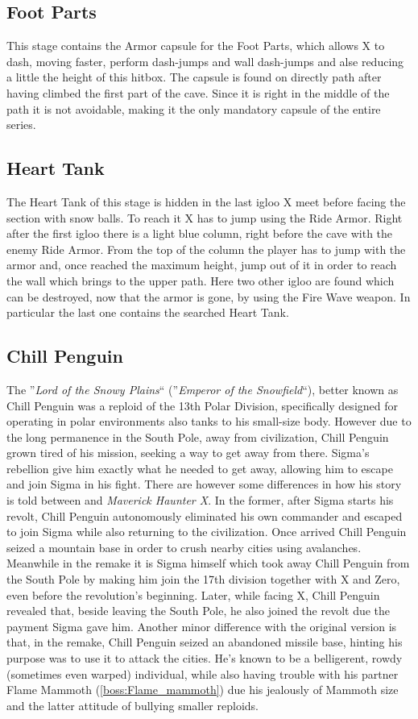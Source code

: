 \subsection{Foot Parts}
This stage contains the Armor capsule for the Foot Parts, which allows X to dash, moving faster, perform dash-jumps and wall dash-jumps and alse reducing a little the height of this hitbox. The capsule is found on directly path after having climbed the first part of the cave. Since it is right in the middle of the path it is not avoidable, making it the only mandatory capsule of the entire series.
\subsection{Heart Tank}
The Heart Tank of this stage is hidden in the last igloo X meet before facing the section with snow balls. To reach it X has to jump using the Ride Armor. Right after the first igloo there is a light blue column, right before the cave with the enemy Ride Armor. From the top of the column the player has to jump with the armor and, once reached the maximum height, jump out of it in order to reach the wall which brings to the upper path. Here two other igloo are found which can be destroyed, now that the armor is gone, by using the Fire Wave weapon. In particular the last one contains the searched Heart Tank.
\subsection{Chill Penguin}\label{boss:Chill_Penguin}
The ''\textit{Lord of the Snowy Plains}``\cite{MHX:manual} (''\textit{Emperor of the Snowfield}``\cite{wayback:X_resources}), better known as Chill Penguin was a reploid of the 13th Polar Division, specifically designed for operating in polar environments also tanks to his small-size body. However due to the long permanence in the South Pole, away from civilization, Chill Penguin grown tired of his mission, seeking a way to get away from there. Sigma's rebellion give him exactly what he needed to get away, allowing him to escape and join Sigma in his fight. There are however some differences in how his story is told between \x and \textit{Maverick Haunter X}. In the former, after Sigma starts his revolt, Chill Penguin autonomously eliminated his own commander and escaped to join Sigma while also returning to the civilization\cite{Xcoll1:Manual_X1}. Once arrived Chill Penguin seized a mountain base in order to crush nearby cities using avalanches. Meanwhile in the remake it is Sigma himself which took away Chill Penguin from the South Pole by making him join the 17th division together with X and Zero, even before the revolution's beginning\cite{MHX:manual}. Later, while facing X, Chill Penguin revealed that, beside leaving the South Pole, he also joined the revolt due the payment Sigma gave him\cite{wiki:MMX_script}. Another minor difference with the original version is that, in the remake, Chill Penguin seized an abandoned missile base, hinting his purpose was to use it to attack the cities. He's known to be a belligerent, rowdy (sometimes even warped) individual, while also having trouble with his partner Flame Mammoth (\ref{boss:Flame_mammoth}) due his jealously of Mammoth size and the latter attitude of bullying smaller reploids.

